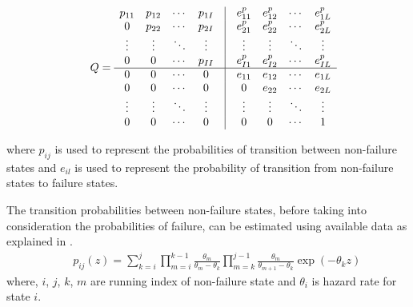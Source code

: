 \documentclass[]{article}
\begin{document}
\begin{eqnarray}
 &  & Q=\begin{array}{ccccccccc}
{p_{11}} & {p_{12}} & \cdots & {p_{1I}} & \vline & {e_{11}^{p}} & {e_{12}^{p}} & \cdots & {e_{1L}^{p}}\\
0 & {p_{22}} & \cdots & {p_{2I}} & \vline & {e_{21}^{p}} & {e_{22}^{p}} & \cdots & {e_{2L}^{p}}\\
\vdots & \vdots & \ddots & \vdots & \vline & \vdots & \vdots & \ddots & \vdots\\
0 & 0 & \cdots & {p_{II}} & \vline & {e_{I1}^{p}} & {e_{I2}^{p}} & \cdots & {e_{IL}^{p}}\\
\hline 0 & 0 & \cdots & 0 & \vline & {e_{11}} & {e_{12}} & \cdots & {e_{1L}}\\
0 & 0 & \cdots & 0 & \vline & 0 & {e_{22}} & \cdots & {e_{2L}}\\
\vdots & \vdots & \ddots & \vdots & \vline & \vdots & \vdots & \ddots & \vdots\\
0 & 0 & \cdots & 0 & \vline & 0 & 0 & \cdots & 1
\end{array}\label{mtpform2}
\end{eqnarray}


where $p_{ij}$ is used to represent the probabilities of transition
between non-failure states and $e_{il}$ is used to represent the
probability of transition from non-failure states to failure states.

The transition probabilities between non-failure states, before taking
into consideration the probabilities of failure, can be estimated using
available data as explained in \citet{Kobayashi2012}. 
\begin{eqnarray}
 &  & {p_{ij}}(z)=\sum\limits _{k=i}^{j}\prod\limits _{m=i}^{k-1}\frac{{\theta_{m}}}{{{\theta_{m}}-{\theta_{k}}}}\prod\limits _{m=k}^{j-1}\frac{{\theta_{m}}}{{{\theta_{m+1}}-{\theta_{k}}}}\exp(-{\theta_{k}}z)\label{mtp-1}
\end{eqnarray}
where, $i$, $j$, $k$, $m$ are running index of non-failure state
and $\theta_{i}$ is hazard rate for state $i$.
\end{document}
